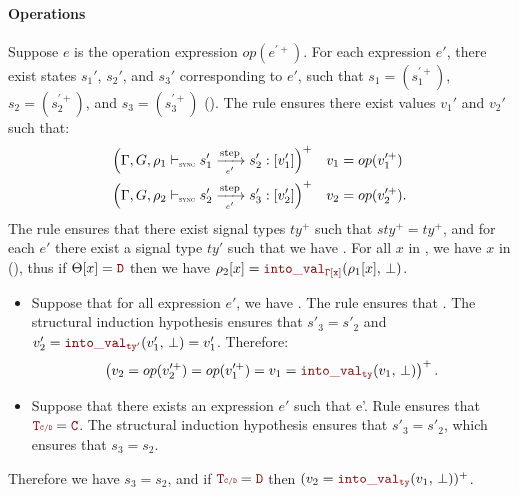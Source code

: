 \begin{skippableproof}
    \paragraph{Operations}
    Suppose $e$ is the operation expression $op(e^{\prime+})$.
    For each expression $e'$, there exist states $s_1'$, $s_2'$, and $s_3'$
    corresponding to $e'$, such that $s_1 = (s_1^{\prime+})$, $s_2 = (s_2^{\prime+})$, and
    $s_3 = (s_3^{\prime+})$ ().
    The rule  ensures there exist values
    $v_1'$ and $v_2'$ such that:
    \begin{align*}
        \left(\exprOpsem{\rho_1}{s'_1}{e'}{s'_2}{v'_1}\right)^+ &  & v_1 & = op(v_1^{\prime+})  \\
        \left(\exprOpsem{\rho_2}{s'_2}{e'}{s'_3}{v'_2}\right)^+ &  & v_2 & = op(v_2^{\prime+}).
    \end{align*}
    The rule  ensures that there exist signal types
    $ty^+$ such that $sty^+ = ty^+$, and for each $e'$ there exist a signal type $ty'$
    such that we have .
    For all $x$ in , we have $x$ in  (), thus if $\Theta[x] = \dType$ then we
    have $\rho_2[x] = \intoVal{\tyCtx[x]}{\rho_1[x]}{\bot}$.

    \begin{itemize}
        \item Suppose that for all expression $e'$, we have 
              {\dType}. The rule  ensures that 
              {\dType}.
              The structural induction hypothesis ensures that $s'_3 = s'_2$ and $v'_2 =
                  \intoVal{ty'}{v'_1}{\bot}= v'_1$.
              Therefore:
              \begin{equation*}
                  \left(v_2 = op(v_2^{\prime+}) = op(v_1^{\prime+}) = v_1 = \intoVal{ty}{v_1}{\bot}\right)^+.
              \end{equation*}

        \item Suppose that there exists an expression $e'$ such that \exprTypedReact
              {\Theta}{e'}{\cType}. Rule  ensures that $\rType = \cType$.
              The structural induction hypothesis ensures that $s'_3 = s'_2$, which
              ensures that $s_3 = s_2$.
    \end{itemize}
    Therefore we have $s_3 = s_2$, and if $\rType = \dType$ then $(v_2 = \intoVal{ty}{v_1}
        {\bot})^+$.


\end{skippableproof}
